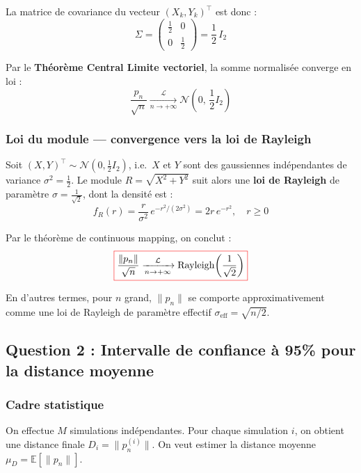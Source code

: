 \documentclass[12pt,a4paper]{report}
\begin{document}
La matrice de covariance du vecteur $(X_k, Y_k)^\top$ est donc :
\[
    \Sigma = \begin{pmatrix} \frac{1}{2} & 0 \\ 0 & \frac{1}{2} \end{pmatrix} = \frac{1}{2}\, I_2
\]

Par le \textbf{Théorème Central Limite vectoriel}, la somme normalisée converge en loi :
\[
    \frac{p_n}{\sqrt{n}} \xrightarrow[n \to +\infty]{\mathcal{L}} \mathcal{N}\!\left(0,\, \frac{1}{2} I_2\right)
\]

\subsubsection{Loi du module — convergence vers la loi de Rayleigh}

Soit $(X, Y)^\top \sim \mathcal{N}(0, \frac{1}{2}I_2)$, i.e.\ $X$ et $Y$ sont des gaussiennes
indépendantes de variance $\sigma^2 = \frac{1}{2}$. Le module $R = \sqrt{X^2 + Y^2}$ suit alors
une \textbf{loi de Rayleigh} de paramètre $\sigma = \frac{1}{\sqrt{2}}$, dont la densité est :
\[
    f_R(r) = \frac{r}{\sigma^2}\,e^{-r^2/(2\sigma^2)} = 2r\,e^{-r^2}, \quad r \geq 0
\]

Par le théorème de continuous mapping, on conclut :
\[
    \fcolorbox{red}{white}{$\displaystyle
        \frac{\|p_n\|}{\sqrt{n}} \xrightarrow[n \to +\infty]{\mathcal{L}} \mathrm{Rayleigh}\!\left(\frac{1}{\sqrt{2}}\right)
    $}
\]

En d'autres termes, pour $n$ grand, $\|p_n\|$ se comporte approximativement comme une loi de
Rayleigh de paramètre effectif $\sigma_\text{eff} = \sqrt{n/2}$.

\subsection{Question 2 : Intervalle de confiance à 95\% pour la distance moyenne}

\subsubsection{Cadre statistique}

On effectue $M$ simulations indépendantes. Pour chaque simulation $i$, on obtient une distance
finale $D_i = \|p_n^{(i)}\|$. On veut estimer la distance moyenne $\mu_D = \mathbb{E}[\|p_n\|]$.
\end{document}
